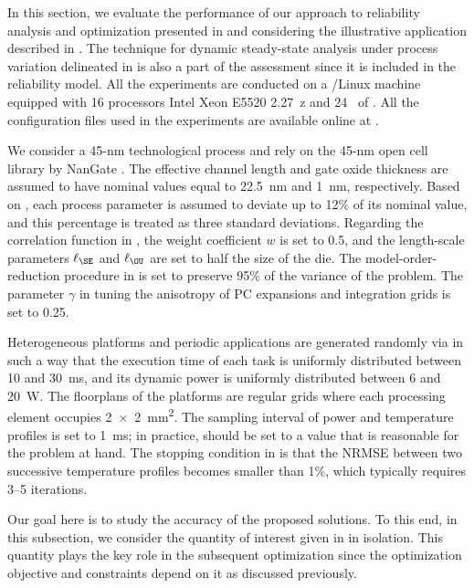 In this section, we evaluate the performance of our approach to reliability
analysis and optimization presented in  and
 considering the illustrative application
described in . The technique for dynamic
steady-state analysis under process variation delineated in
 is also a part of the assessment
since it is included in the reliability model. All the experiments are conducted
on a /Linux machine equipped with 16 processors Intel Xeon E5520
2.27~z and 24~ of . All the configuration files used in
the experiments are available online at \cite{eslab2015}.

We consider a 45-nm technological process and rely on the 45-nm open cell
library by NanGate \cite{nangate}. The effective channel length and gate oxide
thickness are assumed to have nominal values equal to 22.5~nm and 1~nm,
respectively. Based on  \cite{itrs}, each process parameter is assumed
to deviate up to 12\% of its nominal value, and this percentage is treated as
three standard deviations. Regarding the correlation function in
, the weight coefficient $w$ is set to 0.5, and the
length-scale parameters $\ell_\SE$ and $\ell_\OU$ are set to half the size of
the die. The model-order-reduction procedure in
 is set to preserve 95\% of the variance of the
problem. The parameter $\gamma$ in  tuning the
anisotropy of \ac{PC} expansions and integration grids is set to 0.25.

Heterogeneous platforms and periodic applications are generated randomly via
 \cite{dick1998} in such a way that the execution time of each task is
uniformly distributed between 10 and 30~ms, and its dynamic power is uniformly
distributed between 6 and 20~W. The floorplans of the platforms are regular
grids where each processing element occupies 2~×~2~mm\textsuperscript{2}. The
sampling interval \dt of power and temperature profiles is set to 1~ms; in
practice, \dt should be set to a value that is reasonable for the problem at
hand. The stopping condition in  is
that the \ac{NRMSE} between two successive temperature profiles becomes smaller
than 1\%, which typically requires 3--5 iterations.


Our goal here is to study the accuracy of the proposed solutions. To this end,
in this subsection, we consider the quantity of interest given in
 in isolation. This quantity plays the key
role in the subsequent optimization since the optimization objective and
constraints depend on it as discussed previously.

